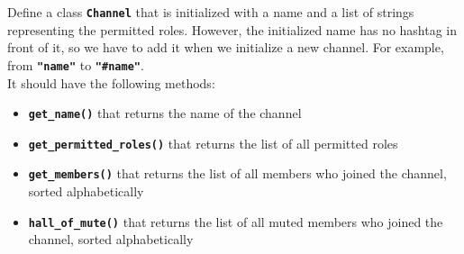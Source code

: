 Define a class \texttt{\bfseries Channel} that is initialized with a name and a list of strings representing the 
permitted roles. However, the initialized name has no hashtag in front of it, so we have to add it when we initialize a new channel.
For example, from \texttt{\bfseries "name"} to \texttt{\bfseries "\#name"}. \\
It should have the following methods:
\begin{itemize}
    \item \texttt{\bfseries get\_name()} that returns the name of the channel
    \item \texttt{\bfseries get\_permitted\_roles()} that returns the list of all permitted roles
    \item \texttt{\bfseries get\_members()} that returns the list of all members who joined the channel, sorted alphabetically
    \item \texttt{\bfseries hall\_of\_mute()} that returns the list of all muted members who joined the channel, sorted alphabetically
\end{itemize}

